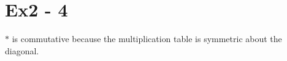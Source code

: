 \section*{Ex2 - 4}
$ * $ is commutative because the multiplication table is symmetric about the diagonal.